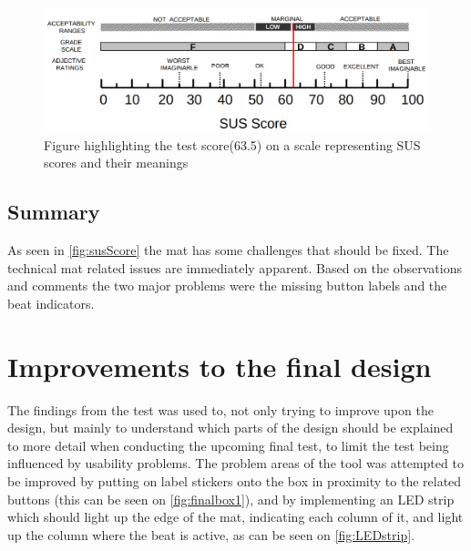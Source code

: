 \begin{figure}[H]
	\centering
	\includegraphics[width=1\linewidth]{figure/Design/susScore}
	\caption{Figure highlighting the test score(63.5) on a scale representing SUS scores and their meanings\cite{susScore}}
	\label{fig:susScore}
\end{figure}

\subsection{Summary}
As seen in \autoref{fig:susScore} the mat has some challenges that should be fixed. The technical mat related issues are immediately apparent. Based on the observations and comments the two major problems were the missing button labels and the beat indicators.

\section{Improvements to the final design}\label{improvementsUsability}
The findings from the test was used to, not only trying to improve upon the design, but mainly to understand which parts of the design should be explained to more detail when conducting the upcoming final test, to limit the test being influenced by usability problems. The problem areas of the tool was attempted to be improved by putting on label stickers onto the box in proximity to the related buttons (this can be seen on \autoref{fig:finalbox1}), and by implementing an LED strip which should light up the edge of the mat, indicating each column of it, and light up the column where the beat is active, as can be seen on \autoref{fig:LEDstrip}.

